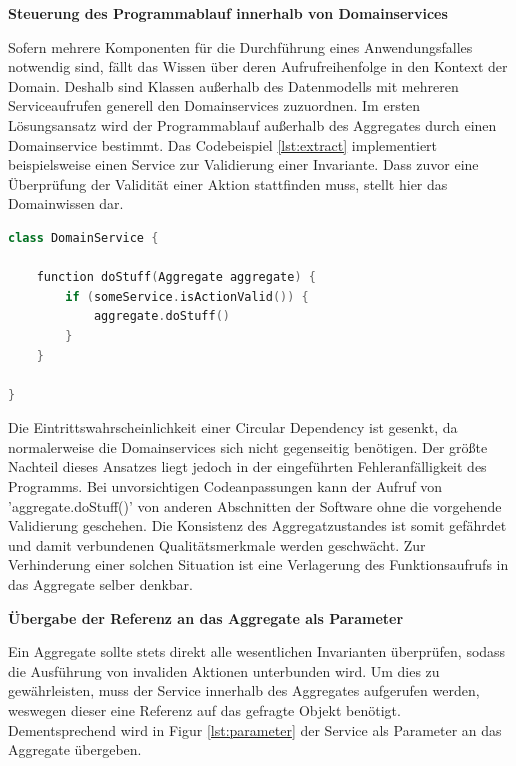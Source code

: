 \textbf{Steuerung des Programmablauf innerhalb von Domainservices}

Sofern mehrere Komponenten für die Durchführung eines Anwendungsfalles notwendig sind, fällt das Wissen über deren Aufrufreihenfolge in den Kontext der Domain. Deshalb sind Klassen außerhalb des Datenmodells mit mehreren Serviceaufrufen generell den Domainservices zuzuordnen. Im ersten Lösungsansatz wird der Programmablauf außerhalb des Aggregates durch einen Domainservice bestimmt. Das Codebeispiel \ref{lst:extract} implementiert beispielsweise einen Service zur Validierung einer Invariante. Dass zuvor eine Überprüfung der Validität einer Aktion stattfinden muss, stellt hier das Domainwissen dar. 

\begin{minipage}{\linewidth} %
	\begin{lstlisting}[caption={Bestimmung des Steuerflusses durch einen Domainservice}, label={lst:extract}, language=Kotlin]
class DomainService {
	
	function doStuff(Aggregate aggregate) {
		if (someService.isActionValid()) {     
			aggregate.doStuff()
		}
	}

}
	\end{lstlisting}
\end{minipage}

Die Eintrittswahrscheinlichkeit einer Circular Dependency ist gesenkt, da normalerweise die Domainservices sich nicht gegenseitig benötigen. Der größte Nachteil dieses Ansatzes liegt jedoch in der eingeführten Fehleranfälligkeit des Programms. Bei unvorsichtigen Codeanpassungen kann der Aufruf von 'aggregate.doStuff()' von anderen Abschnitten der Software ohne die vorgehende Validierung geschehen. Die Konsistenz des Aggregatzustandes ist somit gefährdet und damit verbundenen Qualitätsmerkmale werden geschwächt. Zur Verhinderung einer solchen Situation ist eine Verlagerung des Funktionsaufrufs in das Aggregate selber denkbar.


\textbf{Übergabe der Referenz an das Aggregate als Parameter}

Ein Aggregate sollte stets direkt alle wesentlichen Invarianten überprüfen, sodass die Ausführung von invaliden Aktionen unterbunden wird. Um dies zu gewährleisten, muss der Service innerhalb des Aggregates aufgerufen werden, weswegen dieser eine Referenz auf das gefragte Objekt benötigt. Dementsprechend wird in Figur \ref{lst:parameter} der Service als Parameter an das Aggregate übergeben.

